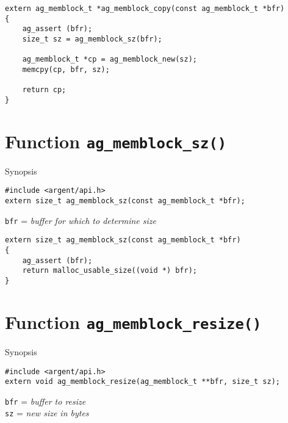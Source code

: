 \lstset{style=CODE}
\begin{lstlisting}[linewidth=1.0\linewidth,
    caption=Definition of ag\_memblock\_copy()]
extern ag_memblock_t *ag_memblock_copy(const ag_memblock_t *bfr)
{
    ag_assert (bfr);
    size_t sz = ag_memblock_sz(bfr);

    ag_memblock_t *cp = ag_memblock_new(sz);
    memcpy(cp, bfr, sz);

    return cp;
}
\end{lstlisting}


%


\section{Function \texttt{ag\_memblock\_sz()}}
  \begin{bclogo}[logo=\bccrayon, noborder=true, barre=snake, couleurBarre=gray]
    {Synopsis}
  \lstset{style=SYNOPSIS}
  \begin{lstlisting}[linewidth=1.0\linewidth]
#include <argent/api.h>
extern size_t ag_memblock_sz(const ag_memblock_t *bfr);
  \end{lstlisting}
  \scriptsize
  \texttt{bfr} = \emph{buffer for which to determine size}
  \end{bclogo}

\lstset{style=CODE}
\begin{lstlisting}[linewidth=1.0\linewidth,
    caption=Definition of ag\_memblock\_sz()]
extern size_t ag_memblock_sz(const ag_memblock_t *bfr)
{
    ag_assert (bfr);
    return malloc_usable_size((void *) bfr);
}
\end{lstlisting}


%


\section{Function \texttt{ag\_memblock\_resize()}}
  \begin{bclogo}[logo=\bccrayon, noborder=true, barre=snake, couleurBarre=gray]
    {Synopsis}
  \lstset{style=SYNOPSIS}
  \begin{lstlisting}[linewidth=1.0\linewidth]
#include <argent/api.h>
extern void ag_memblock_resize(ag_memblock_t **bfr, size_t sz);
  \end{lstlisting}
  \scriptsize
  \texttt{bfr} = \emph{buffer to resize} \\
  \texttt{sz} = \emph{new size in bytes}
  \end{bclogo}

